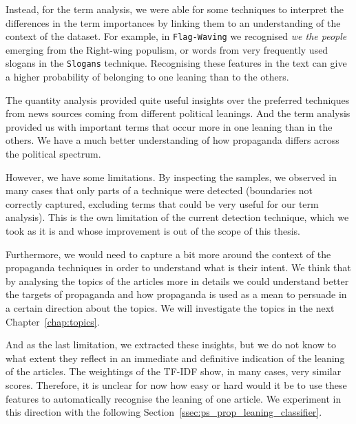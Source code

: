 Instead, for the term analysis, we were able for some techniques to interpret the differences in the term importances by linking them to an understanding of the context of the dataset. For example, in \texttt{Flag-Waving} we recognised \textit{we the people} emerging from the Right-wing populism, or words from very frequently used slogans in the \texttt{Slogans} technique.
Recognising these features in the text can give a higher probability of belonging to one leaning than to the others.

The quantity analysis provided quite useful insights over the preferred techniques from news sources coming from different political leanings. And the term analysis provided us with important terms that occur more in one leaning than in the others.
We have a much better understanding of how propaganda differs across the political spectrum.

However, we have some limitations. By inspecting the samples, we observed in many cases that only parts of a technique were detected (boundaries not correctly captured, excluding terms that could be very useful for our term analysis).
This is the own limitation of the current detection technique, which we took as it is and whose improvement is out of the scope of this thesis.

Furthermore, we would need to capture a bit more around the context of the propaganda techniques in order to understand what is their intent. We think that by analysing the topics of the articles more in details we could understand better the targets of propaganda and how propaganda is used as a mean to persuade in a certain direction about the topics. We will investigate the topics in the next Chapter~\ref{chap:topics}.

And as the last limitation, we extracted these insights, but we do not know to what extent they reflect in an immediate and definitive indication of the leaning of the articles.
The weightings of the TF-IDF show, in many cases, very similar scores. Therefore, it is unclear for now how easy or hard would it be to use these features to automatically recognise the leaning of one article. %
We experiment in this direction with the following Section~\ref{ssec:ps_prop_leaning_classifier}.


